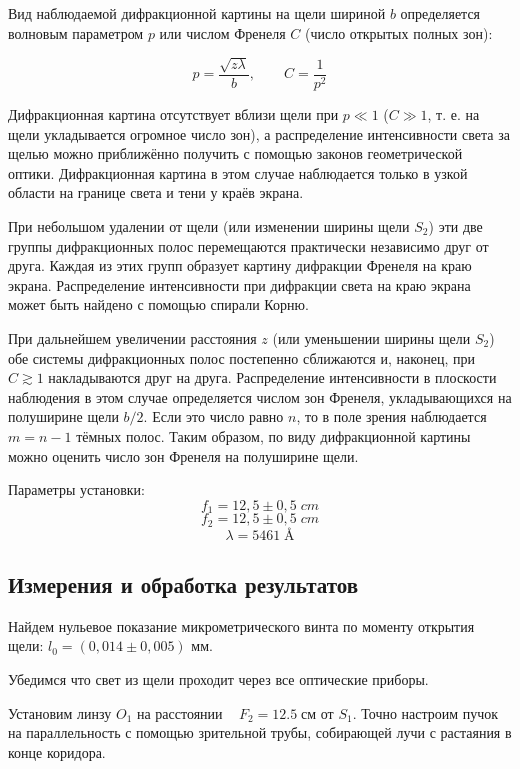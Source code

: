 \documentclass[a4paper,12pt]{article} %
\begin{document}
Вид наблюдаемой дифракционной картины
на щели шириной $ b $ определяется волновым параметром $ p $ или числом Френеля $ C $ (число открытых полных зон):


\begin{equation}\label{}
p = \dfrac{\sqrt{z \lambda}}{b}, \qquad C = \dfrac{1}{p^2}
\end{equation}

Дифракционная картина отсутствует вблизи щели при $ p \ll 1 $ ($ C \gg 1 $, т. е. на щели укладывается огромное число зон), а распределение интенсивности света за щелью можно приближённо получить с помощью законов геометрической оптики. Дифракционная картина в этом случае наблюдается только в узкой области на границе света и тени у краёв экрана.

При небольшом удалении от щели (или изменении ширины щели $ S_2 $) эти две группы дифракционных полос перемещаются практически независимо друг от друга. Каждая из этих групп образует картину дифракции Френеля на краю экрана. Распределение интенсивности при дифракции света на краю экрана может быть найдено с помощью спирали Корню.

При дальнейшем увеличении расстояния $ z $ (или уменьшении ширины щели $ S_2 $) обе системы дифракционных полос постепенно сближаются и, наконец, при $ C \gtrsim 1 $ накладываются друг на друга. Распределение интенсивности в плоскости наблюдения в этом случае определяется числом зон Френеля, укладывающихся на полуширине щели $ b/2 $. Если это число равно $ n $, то в поле зрения наблюдается $ m = n - 1 $ тёмных полос. Таким образом, по виду дифракционной картины можно оценить число зон Френеля на полуширине щели.

Параметры установки:
\[ f_1 = 12,5\pm 0,5\;cm \]
\[ f_2 = 12,5\pm 0,5 \;cm \]
\[ \lambda = 5461\;\text{\AA} \]

\subsection{Измерения и обработка результатов}

Найдем нульевое показание микрометрического винта по моменту открытия щели: $l_0 = (0,014 \pm 0,005)$ мм.

Убедимся что свет из щели проходит через все оптические приборы.

Установим линзу \(O_1\) на расстоянии ~ \(F_2 = 12.5\;см\) от \(S_1\). Точно настроим пучок на параллельность с помощью зрительной трубы, собирающей лучи с растаяния в конце коридора.
\end{document}
